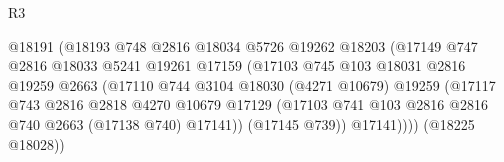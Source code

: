 \begin{lexlean}{R3}
\begin{coremodule}
                                          @18191
                                          (@18193
                                            @748
                                            @2816
                                            @18034
                                            @5726
                                            @19262
                                            @18203
                                            (@17149
                                              @747
                                              @2816
                                              @18033
                                              @5241
                                              @19261
                                              @17159
                                              (@17103
                                                @745
                                                @103
                                                @18031
                                                @2816
                                                @19259
                                                @2663
                                                (@17110
                                                  @744
                                                  @3104
                                                  @18030
                                                  (@4271 @10679)
                                                  @19259
                                                  (@17117
                                                    @743
                                                    @2816
                                                    @2818
                                                    @4270
                                                    @10679
                                                    @17129
                                                    (@17103
                                                      @741
                                                      @103
                                                      @2816
                                                      @2816
                                                      @740
                                                      @2663
                                                      (@17138 @740)
                                                      @17141))
                                                  (@17145 @739))
                                                @17141))))
                                        (@18225 @18028))

\end{coremodule}
\end{lexlean}
